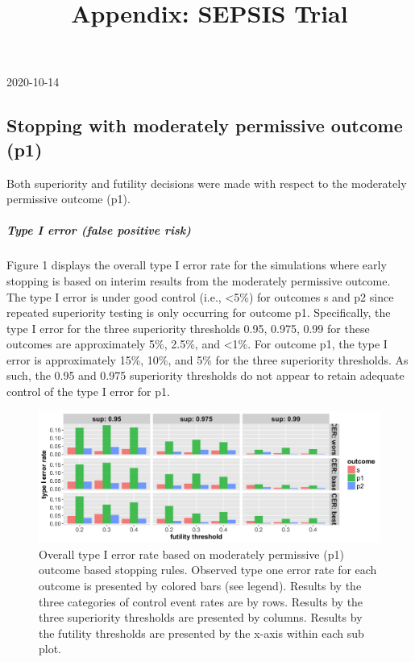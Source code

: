 \documentclass[]{article}
\title{Appendix: SEPSIS Trial}
\author{}
\date{\vspace{-2.5em}}
\let\oldsubparagraph\subparagraph
\renewcommand{\subparagraph}[1]{\oldsubparagraph{#1}\mbox{}}
\begin{document}
\maketitle

2020-10-14

\hypertarget{stopping-with-moderately-permissive-outcome-p1}{%
\subsection{Stopping with moderately permissive outcome
(p1)}\label{stopping-with-moderately-permissive-outcome-p1}}

Both superiority and futility decisions were made with respect to the
moderately permissive outcome (p1).

\hypertarget{type-i-error-false-positive-risk}{%
\subparagraph{Type I error (false positive
risk)}\label{type-i-error-false-positive-risk}}

Figure 1 displays the overall type I error rate for the simulations
where early stopping is based on interim results from the moderately
permissive outcome. The type I error is under good control (i.e.,
\textless{}5\%) for outcomes s and p2 since repeated superiority testing
is only occurring for outcome p1. Specifically, the type I error for the
three superiority thresholds 0.95, 0.975, 0.99 for these outcomes are
approximately 5\%, 2.5\%, and \textless{}1\%. For outcome p1, the type I
error is approximately 15\%, 10\%, and 5\% for the three superiority
thresholds. As such, the 0.95 and 0.975 superiority thresholds do not
appear to retain adequate control of the type I error for p1.

\captionsetup[figure]{font=small,labelfont=small}

\begin{figure}
  \caption{Overall type I error rate based on moderately permissive (p1) outcome based stopping rules. Observed type one
  error rate for each outcome is presented by colored bars (see legend). Results by the three categories of control
  event rates are by rows. Results by the three superiority thresholds are presented by columns. Results by the futility
  thresholds are presented by the x-axis within each sub plot.}
  \includegraphics{../plots/stop_p1_new/alpha_sim_05_stopp1_new.png}
\end{figure}
\end{document}
